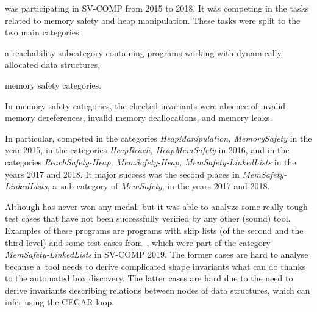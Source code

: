 {\forester{} was participating in SV-COMP from 2015 to 2018.
It was competing in the tasks related to memory safety and heap manipulation.
These tasks were split to the two main categories:
\begin{enumerate*}
  \item a reachability subcategory containing programs working with dynamically allocated data structures,
  \item memory safety categories.
\end{enumerate*}
In memory safety categories, the checked invariants were absence of invalid memory dereferences,
invalid memory deallocations, and memory leaks.

In particular,
\forester{} competed in the categories \emph{HeapManipulation, MemorySafety} in the year 2015,
in the categories \emph{HeapReach, HeapMemSafety} in 2016, and
in the categories \emph{ReachSafety-Heap, MemSafety-Heap, MemSafety-LinkedLists} in the years 2017 and 2018.
It major success was the second places in \emph{MemSafety-LinkedLists},
a~sub-category of \emph{MemSafety}, in the years 2017 and 2018.

Although \forester{} has never won any medal, but it was able to analyze
some really tough test cases that have not been successfully verified by any
other (sound) tool.
Examples of these programs are programs with skip lists (of the second and the
third level) and some test cases from~\cite{vmcai17}, which were part of the
category \emph{MemSafety-LinkedLists} in SV-COMP 2019.
The former cases are hard to analyse because a~tool needs to derive
complicated shape invariants what \forester{} can do thanks to the automated
box discovery.
The latter cases are hard due to the need to derive invariants describing relations
between nodes of data structures, which \forester{} can infer using the CEGAR
loop.

}
